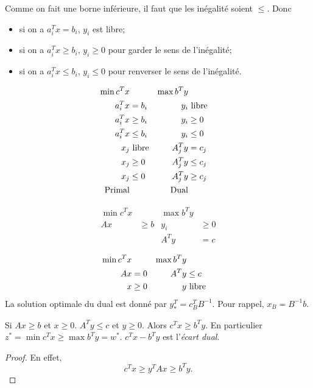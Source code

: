 Comme on fait une borne inférieure, il faut que les inégalité soient $\leq$.
Donc
\begin{itemize}
  \item si on a $a_i^Tx = b_i$, $y_i$ est libre;
  \item si on a $a_i^Tx \geq b_i$, $y_i \geq 0$ pour garder
    le sens de l'inégalité;
  \item si on a $a_i^Tx \leq b_i$, $y_i \leq 0$ pour renverser
    le sens de l'inégalité.
\end{itemize}

\begin{mytheo}
  \begin{align*}
    \min c^T x & & \max b^Ty\\
    a_i^Tx & = b_i & y_i & \textrm{ libre}\\
    a_i^Tx & \geq b_i & y_i & \geq 0\\
    a_i^Tx & \leq b_i & y_i & \leq 0\\
    x_j & \textrm{ libre} & A_j^T y & = c_j\\
    x_j & \geq 0 & A_j^Ty & \leq c_j\\
    x_j & \leq 0 & A_j^Ty & \geq c_j\\
    \mathrm{Primal} & & \mathrm{Dual}
  \end{align*}
\end{mytheo}
\begin{mytheo}
  \begin{align*}
    \min c^Tx & & \max b^Ty\\
    Ax & \geq b & y_i & \geq 0\\
    & & A^Ty & = c
  \end{align*}
\end{mytheo}

\begin{mytheo}
  \begin{align*}
    \min c^Tx & & \max b^Ty\\
    Ax & = 0 & A^Ty & \leq c\\
    x & \geq 0 & y & \textrm{ libre}
  \end{align*}
  La solution optimale du dual est donné par $y_*^T = c_B^TB^{-1}$.
  Pour rappel, $x_B = B^{-1}b$.
\end{mytheo}

\begin{myprop}
  Si $Ax \geq b$ et $x \geq 0$. $A^Ty \leq c$ et $y \geq 0$.
  Alors $c^Tx \geq b^Ty$.
  En particulier $z^* = \min c^T x \geq \max b^Ty = w^*$.
  $c^Tx-b^Ty$ est l'\emph{écart dual}.
  \begin{proof}
    En effet,
    \[ c^Tx \geq y^TAx \geq b^Ty. \]
  \end{proof}
\end{myprop}

